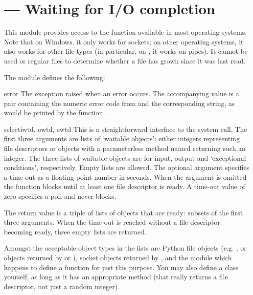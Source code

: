 \section{ ---
         Waiting for I/O completion}



This module provides access to the function 
available in most operating systems.  Note that on Windows, it only
works for sockets; on other operating systems, it also works for other
file types (in particular, on \UNIX{}, it works on pipes).  It cannot
be used or regular files to determine whether a file has grown since
it was last read.

The module defines the following:

\begin{excdesc}{error}
The exception raised when an error occurs.  The accompanying value is
a pair containing the numeric error code from  and the
corresponding string, as would be printed by the \C{} function
.
\end{excdesc}

\begin{funcdesc}{select}{iwtd, owtd, ewtd}
This is a straightforward interface to the \UNIX{} 
system call.  The first three arguments are lists of `waitable
objects': either integers representing \UNIX{} file descriptors or
objects with a parameterless method named  returning
such an integer.  The three lists of waitable objects are for input,
output and `exceptional conditions', respectively.  Empty lists are
allowed.  The optional  argument specifies a time-out as a
floating point number in seconds.  When the  argument
is omitted the function blocks until at least one file descriptor is
ready.  A time-out value of zero specifies a poll and never blocks.

The return value is a triple of lists of objects that are ready:
subsets of the first three arguments.  When the time-out is reached
without a file descriptor becoming ready, three empty lists are
returned.

Amongst the acceptable object types in the lists are Python file
objects (e.g. , or objects returned by
 or ), socket objects
returned by ,%
and the module  which happens to
define a function
for just this purpose.  You may
also define a  class yourself, as long as it has an
appropriate  method (that really returns a \UNIX{}
file descriptor, not just a random integer).
\end{funcdesc}
